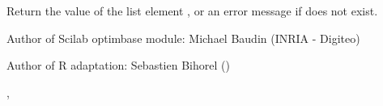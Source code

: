 %
\begin{Value}
Return the value of the list element , or an error message if
 does not exist.  
\end{Value}
%
\begin{Author}\relax
Author of Scilab optimbase module: Michael Baudin (INRIA - Digiteo)

Author of R adaptation: Sebastien Bihorel ()
\end{Author}
%
\begin{SeeAlso}\relax
{},
\end{SeeAlso}
